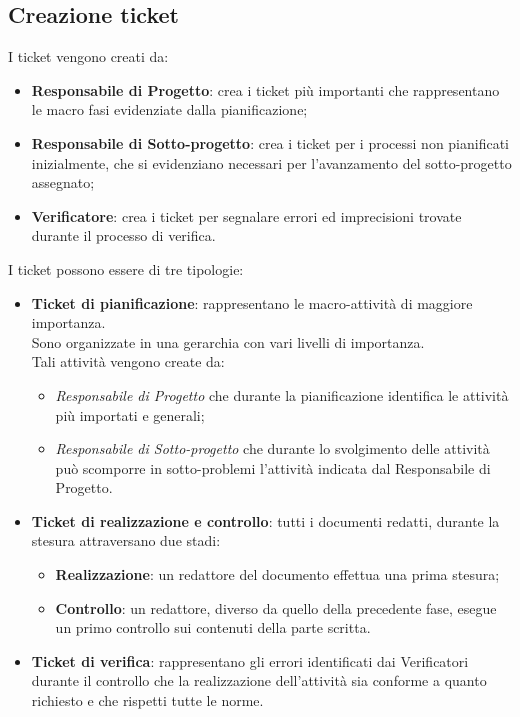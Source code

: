 \documentclass[a4paper,12pt]{article}
\begin{document}
\subsection{Creazione ticket}
{ 
  I ticket vengono creati da:
 \begin{itemize}
 

    \item \textbf{Responsabile di Progetto}: crea i ticket più importanti che rappresentano le macro fasi evidenziate dalla pianificazione; 
	\item \textbf{Responsabile di Sotto-progetto}: crea i ticket per i processi non pianificati inizialmente, che si evidenziano necessari per l’avanzamento   del sotto-progetto assegnato; 
	\item \textbf{Verificatore}: crea i ticket per segnalare errori ed imprecisioni trovate durante il 
processo di verifica. 

 \end{itemize}


I ticket possono essere di tre tipologie:
\begin{itemize}


\item \textbf{Ticket di pianificazione}: rappresentano le macro-attività di maggiore importanza.\\ Sono organizzate in una gerarchia con vari livelli di importanza.\\
 Tali attività vengono create da: 
\begin{itemize}
\item \emph{Responsabile di Progetto} che durante la pianificazione identifica le attività 
più importati e generali; 
\item \emph{Responsabile di Sotto-progetto} che durante lo svolgimento delle attività può 
scomporre in sotto-problemi l’attività indicata dal Responsabile di Progetto. 
\end{itemize}


\item \textbf{Ticket di realizzazione e controllo}: tutti i documenti redatti, durante la stesura attraversano due stadi: 
\begin{itemize}
\item \textbf{Realizzazione}: un redattore del documento effettua una prima stesura; 
\item \textbf{Controllo}: un redattore, diverso da quello della precedente fase, esegue un primo controllo sui contenuti della parte scritta. 
\end{itemize}


\item \textbf{Ticket di verifica}: rappresentano gli errori identificati dai Verificatori durante 
il controllo che la realizzazione dell’attività sia conforme a quanto richiesto e che 
rispetti tutte le norme.
\end{itemize}
}
\end{document}
